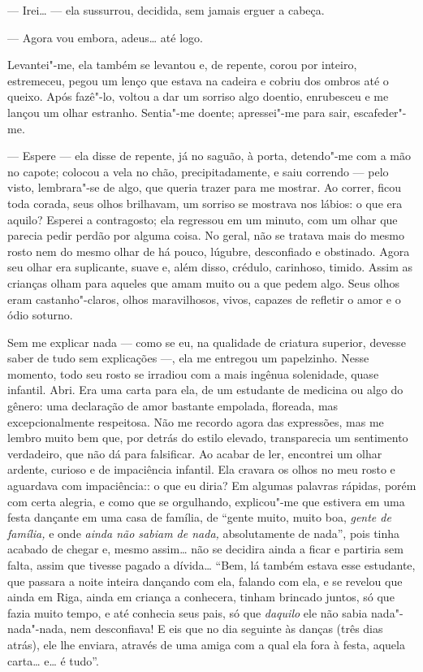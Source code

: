 --- Irei\ldots{} --- ela sussurrou, decidida, sem jamais erguer a cabeça.

--- Agora vou embora, adeus\ldots{} até logo.

Levantei"-me, ela também se levantou e, de repente, corou por inteiro,
estremeceu, pegou um lenço que estava na cadeira e cobriu dos ombros até
o queixo. Após fazê"-lo, voltou a dar um sorriso algo doentio, enrubesceu
e me lançou um olhar estranho. Sentia"-me doente; apressei"-me para sair,
escafeder"-me.

--- Espere --- ela disse de repente, já no saguão, à porta, detendo"-me com
a mão no capote; colocou a vela no chão, precipitadamente, e saiu
correndo --- pelo visto, lembrara"-se de algo, que queria trazer para me
mostrar. Ao correr, ficou toda corada, seus olhos brilhavam, um sorriso
se mostrava nos lábios: o que era aquilo? Esperei a contragosto; ela
regressou em um minuto, com um olhar que parecia pedir perdão por alguma
coisa. No geral, não se tratava mais do mesmo rosto nem do mesmo olhar
de há pouco, lúgubre, desconfiado e obstinado. Agora seu olhar era
suplicante, suave e, além disso, crédulo, carinhoso, timido. Assim as
crianças olham para aqueles que amam muito ou a que pedem algo. Seus
olhos eram castanho"-claros, olhos maravilhosos, vivos, capazes de
refletir o amor e o ódio soturno.

Sem me explicar nada --- como se eu, na qualidade de criatura superior,
devesse saber de tudo sem explicações ---, ela me entregou um papelzinho.
Nesse momento, todo seu rosto se irradiou com a mais ingênua solenidade,
quase infantil. Abri. Era uma carta para ela, de um estudante de
medicina ou algo do gênero: uma declaração de amor bastante empolada,
floreada, mas excepcionalmente respeitosa. Não me recordo agora das
expressões, mas me lembro muito bem que, por detrás do estilo elevado,
transparecia um sentimento verdadeiro, que não dá para falsificar. Ao
acabar de ler, encontrei um olhar ardente, curioso e de impaciência
infantil. Ela cravara os olhos no meu rosto e aguardava com
impaciência:: o que eu diria? Em algumas palavras rápidas, porém com
certa alegria, e como que se orgulhando, explicou"-me que estivera em uma
festa dançante em uma casa de família, de ``gente muito, muito boa,
\emph{gente de família,} e onde \emph{ainda não sabiam de nada,}
absolutamente de nada'', pois tinha acabado de chegar e, mesmo assim\ldots{}
não se decidira ainda a ficar e partiria sem falta, assim que tivesse
pagado a dívida\ldots{} ``Bem, lá também estava esse estudante, que passara a
noite inteira dançando com ela, falando com ela, e se revelou que ainda
em Riga, ainda em criança a conhecera, tinham brincado juntos, só que
fazia muito tempo, e até conhecia seus pais, só que \emph{daquilo} ele
não sabia nada"-nada"-nada, nem desconfiava! E eis que no dia seguinte às
danças (três dias atrás), ele lhe enviara, através de uma amiga com a
qual ela fora à festa, aquela carta\ldots{} e\ldots{} é tudo''.

